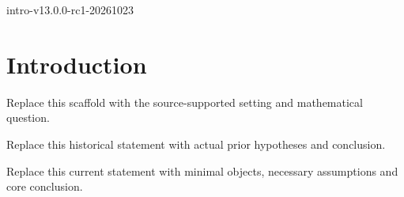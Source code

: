\def\IntroExpectedRelease{intro-v13.0.0-rc1-20261023}

\ifdefined\IntroRelease
  \edef\IntroActualRelease{\IntroRelease}
  \ifx\IntroActualRelease\IntroExpectedRelease
  \else
    \PackageError{intro-v13}{Release mismatch}{Use the matching release.}
  \fi
\else
  \PackageError{intro-v13}{Missing profile release identity}{Use the matching release.}
\fi

\section{Introduction}
\begin{introparagraph}
Replace this scaffold with the source-supported setting and mathematical question.
\end{introparagraph}
\begin{historical}
Replace this historical statement with actual prior hypotheses and conclusion.
\end{historical}
\begin{resultgroup}
\begin{theorem}
Replace this current statement with minimal objects, necessary assumptions and core conclusion.
\end{theorem}
\end{resultgroup}
